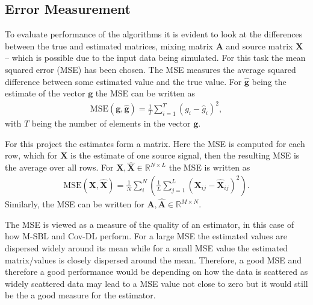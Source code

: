 \subsection{Error Measurement}\label{sec:mse}  
To evaluate performance of the algorithms it is evident to look at the differences between the true and estimated matrices, mixing matrix $\mathbf{A}$ and source matrix $\mathbf{X}$ -- which is possible due to the input data being simulated. 
For this task the mean squared error (MSE) has been chosen. 
The MSE measures the average squared difference between some estimated value and the true value. 
For $\hat{\textbf{g}}$ being the estimate of the vector $\textbf{g}$ the MSE can be written as 
\begin{align*}
\text{MSE}(\textbf{g},\hat{\textbf{g}}) = \frac{1}{T} \sum_{i=1}^T (g_i - \hat{g}_i)^2,  
\end{align*}
with $T$ being the number of elements in the vector $\textbf{g}$. 

For this project the estimates form a matrix. Here the MSE is computed for each row, which for $\mathbf{X}$ is the estimate of one source signal, then the resulting MSE is the average over all rows. 
For $\mathbf{X}, \hat{\mathbf{X}} \in \mathbb{R}^{N \times L}$ the MSE is written as 
\begin{align*}
\text{MSE}(\mathbf{X},\hat{\mathbf{X}}) = \frac{1}{N} \sum_{i}^{N} \left( \frac{1}{L} \sum_{j=1}^L (\mathbf{X}_{ij} - \hat{\mathbf{X}}_{ij})^2\right).  
\end{align*}
Similarly, the MSE can be written for $\mathbf{A},\hat{\mathbf{A}} \in \mathbb{R}^{M \times N}$.  

The MSE is viewed as a measure of the quality of an estimator, in this case of how M-SBL and Cov-DL perform. 
For a large MSE the estimated values are dispersed widely around its mean while for a small MSE value the estimated matrix/values is closely dispersed around the mean.  
Therefore, a good MSE and therefore a good performance would be depending on how the data is scattered as widely scattered data may lead to a MSE value not close to zero but it would still be the a good measure for the estimator.

